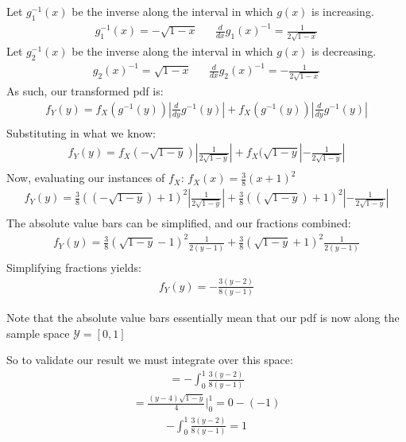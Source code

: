 \documentclass{article}
\begin{document}
Let $g_{1}^{-1}(x)$ be the inverse along the interval in which $g(x)$ is increasing.
\begin{align*}
g_{1}^{-1}(x) =-\sqrt{1-x} && \frac{d}{dx} g_{1}(x)^{-1} = \frac{1}{2\sqrt{1-x}}
\end{align*}
Let $g_{2}^{-1}(x)$ be the inverse along the interval in which $g(x)$ is decreasing.
\begin{align*}
g_{2}(x)^{-1} = \sqrt{1-x} && \frac{d}{dx} g_{2}(x)^{-1} = -\frac{1}{2\sqrt{1-x}}
\end{align*}
As such, our transformed pdf is:
\begin{align*}
f_Y(y) = f_X(g^{-1}(y))|\frac{d}{dy}g^{-1}(y)| + f_X(g^{-1}(y))|\frac{d}{dy}g^{-1}(y)| \\
\end{align*}
Substituting in what we know:
\begin{align*}
f_Y(y) = f_X(-\sqrt{1-y})|\frac{1}{2\sqrt{1-y}}| + f_X(\sqrt{1-y}|-\frac{1}{2\sqrt{1-y}}| \\
\end{align*}
Now, evaluating our instances of $f_X$: $f_X(x)=\frac{3}{8}(x+1)^2$
\begin{align*}
f_Y(y) = \frac{3}{8}((-\sqrt{1-y})+1)^2|\frac{1}{2\sqrt{1-y}}| + \frac{3}{8}((\sqrt{1-y})+1)^2|-\frac{1}{2\sqrt{1-y}}| \\
\end{align*}
The absolute value bars can be simplified, and our fractions combined:
\begin{align*}
f_Y(y) = \frac{3}{8}(\sqrt{1-y}-1)^2 \frac{1}{2(y-1)} + \frac{3}{8}(\sqrt{1-y}+1)^2 \frac{1}{2(y-1)} \\
\end{align*}
Simplifying fractions yields:
\begin{align*}
\boxed{f_Y(y) = -\frac{3(y-2)}{8(y-1)} }
\end{align*}

Note that the absolute value bars essentially mean that our pdf is now along the sample space $\mathcal{Y}=[0,1]$

So to validate our result we must integrate over this space:
\begin{align*}
 = -\int_{0}^{1} \frac{3(y-2)}{8(y-1)}
\end{align*}
\begin{align*}
 = \frac{(y-4)\sqrt{1-y}}{4}|_{0}^{1} = 0 - (-1)
\end{align*}
\begin{align*}
\boxed{-\int_{0}^{1} \frac{3(y-2)}{8(y-1)} = 1 }
\end{align*}
\end{document}
